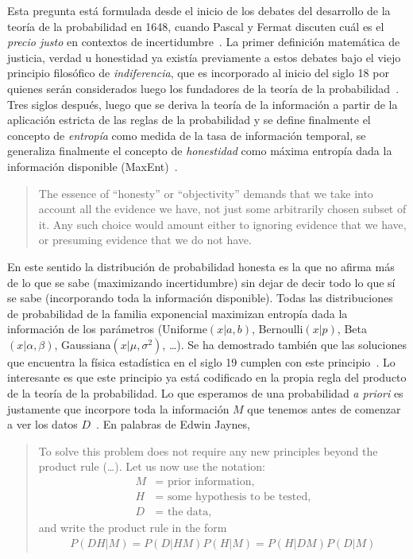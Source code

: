 \documentclass[a4paper,11pt]{book}
\theoremstyle{definition}
\begin{document}
Esta pregunta está formulada desde el inicio de los debates del desarrollo de la teor\'ia de la probabilidad en 1648, cuando Pascal y Fermat discuten cuál es el \emph{precio justo} en contextos de incertidumbre~\cite{devlin2008-theUnfinishedGame}.
%
La primer definición matemática de justicia, verdad u honestidad ya exist\'ia previamente a estos debates bajo el viejo principio filosófico de \emph{indiferencia}, que es incorporado al inicio del siglo 18 por quienes serán considerados luego los fundadores de la teor\'ia de la probabilidad~\cite{jaynes1984-bayesianBackground}.
%
Tres siglos después, luego que se deriva la teor\'ia de la información a partir de la aplicación estricta de las reglas de la probabilidad y se define finalmente el concepto de \emph{entrop\'ia} como medida de la tasa de información temporal, se generaliza finalmente el concepto de \emph{honestidad} como máxima entrop\'ia dada la información disponible (MaxEnt)~\cite{Jaynes2003}.
%
\begin{quotation}
The essence of ``honesty'' or ``objectivity'' demands that we take into account all the evidence we have, not just some arbitrarily chosen subset of it. Any such choice would amount either to ignoring evidence that we have, or presuming evidence that we do not have.
\end{quotation}
%
En este sentido la distribución de probabilidad honesta es la que no afirma más de lo que se sabe (maximizando incertidumbre) sin dejar de decir todo lo que s\'i se sabe (incorporando toda la información disponible).
%
Todas las distribuciones de probabilidad de la familia exponencial maximizan entrop\'ia dada la información de los parámetros (Uniforme$(x|a,b)$, Bernoulli$(x|p)$, Beta$(x|\alpha, \beta)$, Gaussiana$(x|\mu, \sigma^2)$, \dots).
%
Se ha demostrado también que las soluciones que encuentra la f\'isica estad\'istica en el siglo 19 cumplen con este principio~\cite{jaynes1957-I, jaynes1957-II}.
%
Lo interesante es que este principio ya está codificado en la propia regla del producto de la teor\'ia de la probabilidad.
%
Lo que esperamos de una probabilidad \emph{a priori} es justamente que incorpore toda la información $M$ que tenemos antes de comenzar a ver los datos $D$~\cite{Jaynes2003}.
%
En palabras de Edwin Jaynes,
%
\begin{quotation}
To solve this problem does not require any new principles beyond the product rule (\dots). Let us now use the notation:
\begin{align*}
M &= \text{ prior information,} \\
H &= \text{ some hypothesis to be tested,} \\
D &= \text{ the data,}
\end{align*}
and write the product rule in the form
\begin{align}
P(DH|M) = P(D|HM)P(H|M) = P(H|DM)P(D|M)
\end{align}
\end{quotation}
\end{document}
